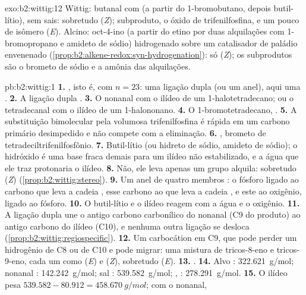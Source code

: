 \begin{solution}{exo:b2:wittig:12}
Wittig: butanal com  (a partir do 1-bromobutano, depois butil-lítio), sem sais:
sobretudo (\textit{Z}); subproduto, o óxido de trifenilfosfina, e um pouco de isômero (\textit{E}).
Alcino: oct-4-ino (a partir do etino por duas alquilações com 1-bromopropano e amideto de sódio)
hidrogenado sobre um catalisador de paládio envenenado (\cref{prop:b2:alkene-redox:syn-hydrogenation}):
só (\textit{Z}); os subprodutos são o brometo de sódio e a amônia das alquilações.
\end{solution}

\begin{solution}{pb:b2:wittig:1}
\textbf{1.} , isto é,  com $n = 23$: uma ligação dupla (ou um anel), aqui uma
.
\textbf{2.} A ligação dupla .
\textbf{3.} O nonanal  com o ilídeo de um 1-halotetradecano; ou o tetradecanal
 com o ilídeo de um 1-halononano.
\textbf{4.} O 1-bromotetradecano, .
\textbf{5.} A substituição bimolecular pela volumosa trifenilfosfina é rápida em um carbono primário
desimpedido e não compete com a eliminação.
\textbf{6.} , brometo de tetradeciltrifenilfosfônio.
\textbf{7.} Butil-lítio (ou hidreto de sódio, amideto de sódio); o hidróxido é uma base fraca demais
para um ilídeo não estabilizado, e a água que ele traz protonaria o ilídeo.
\textbf{8.} Não, ele leva apenas um grupo alquila: sobretudo (\textit{Z}) (\cref{prop:b2:wittig:stereo}).
\textbf{9.} Um anel de quatro membros : o fósforo ligado ao carbono que leva a cadeia
, esse carbono ao que leva a cadeia , e este ao oxigênio, ligado ao
fósforo.
\textbf{10.} O butil-lítio e o ilídeo reagem com a água e o oxigênio.
\textbf{11.} A ligação dupla une o antigo carbono carbonílico do nonanal (C9 do produto) ao antigo
carbono do ilídeo (C10), e nenhuma outra ligação se desloca (\cref{prop:b2:wittig:regiospecific}).
\textbf{12.} Um carbocátion em C9, que pode perder um hidrogênio de C8 ou de C10 e pode migrar: uma
mistura de tricos-8-eno e tricos-9-eno, cada um como (\textit{E}) e (\textit{Z}), sobretudo (\textit{E}).
\textbf{13.} .
\textbf{14.} Alvo : \qty{322.621}{g/mol}; nonanal : \qty{142.242}{g/mol}; sal
: \qty{539.582}{g/mol}; , : \qty{278.291}{g/mol}.
\textbf{15.} O ilídeo  pesa $539.582 - 80.912 = \qty{458.670}{g/mol}$; com o nonanal,

\end{solution}
